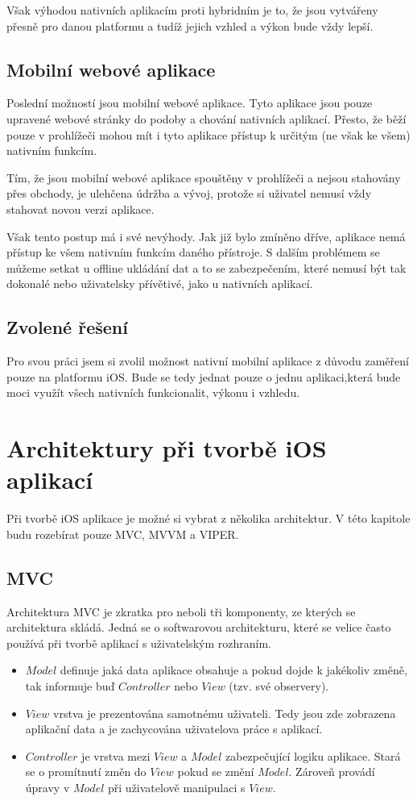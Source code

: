 \documentclass[thesis=M,czech]{FITthesis}[2012/06/26]
\begin{document}
Však výhodou nativních aplikacím proti hybridním je to, že jsou vytvářeny přesně pro danou platformu a tudíž jejich vzhled a výkon bude vždy lepší. \cite{upwork}

\subsection{Mobilní webové aplikace}
Poslední možností jsou mobilní webové aplikace. Tyto aplikace jsou pouze upravené webové stránky do podoby a chování nativních aplikací. Přesto, že běží pouze v prohlížeči mohou mít i tyto aplikace přístup k určitým (ne však ke všem) nativním funkcím. \cite{Nielsen}

Tím, že jsou mobilní webové aplikace spouštěny v prohlížeči a nejsou stahovány přes obchody, je ulehčena údržba a vývoj, protože si uživatel nemusí vždy stahovat novou verzi aplikace.

Však tento postup má i své nevýhody. Jak již bylo zmíněno dříve, aplikace nemá přístup ke všem nativním funkcím daného přístroje. S dalším problémem se můžeme setkat u offline ukládání dat a to se zabezpečením, které nemusí být tak dokonalé nebo uživatelsky přívětivé, jako u nativních aplikací.  \cite{saleforce}

\subsection{Zvolené řešení}
Pro svou práci jsem si zvolil možnost nativní mobilní aplikace z důvodu zaměření pouze na platformu iOS. Bude se tedy jednat pouze o jednu aplikaci,která bude moci využít všech nativních funkcionalit, výkonu i vzhledu.

\section{Architektury při tvorbě iOS aplikací}
Při tvorbě iOS aplikace je možné si vybrat z několika architektur. V této kapitole budu rozebírat pouze MVC, MVVM a VIPER.

\subsection{MVC}
Architektura MVC je zkratka pro  neboli tři komponenty, ze kterých se architektura skládá. Jedná se o softwarovou architekturu, které se velice často používá při tvorbě aplikací s uživatelským rozhraním. \cite{MVCMozilla}
\begin{itemize}
\item $Model$ definuje jaká data aplikace obsahuje a pokud dojde k jakékoliv změně, tak informuje buď $Controller$ nebo $View$ (tzv. své observery). \cite{MVCGoogle}
\item $View$ vrstva je prezentována samotnému uživateli. Tedy jsou zde zobrazena aplikační data a je zachycována uživatelova práce s aplikací.\cite{MVCMozilla}
\item $Controller$ je vrstva mezi $View$ a $Model$ zabezpečující logiku aplikace. Stará se o promítnutí změn do $View$ pokud se změní $Model$. Zároveň provádí úpravy v $Model$ při uživatelově manipulaci s $View$.  \cite{MVCGoogle}
\end{itemize}
\end{document}
